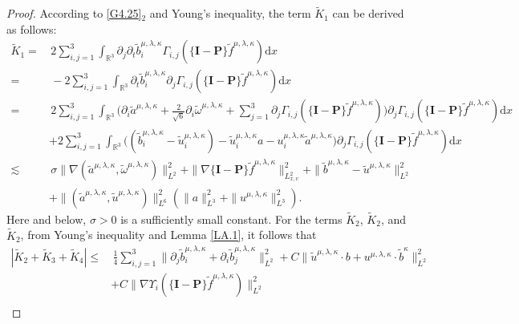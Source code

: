 \documentclass[reqno,11pt]{amsart}
\theoremstyle{plain}
\numberwithin{equation}{section}
\begin{document}
\begin{proof}
According to \eqref{G4.25}$_2$ and Young’s inequality, the term $\widetilde{K}_1$  can be derived as follows:  
\begin{align*}
\widetilde{K}_1=&\, 2\sum_{i, j=1}^3 \int_{\mathbb{R}^3}   \partial_j \partial_t \widetilde{b}^{\mu,\lambda,\kappa}_i   \Gamma_{i, j}(\{\mathbf{I}-\mathbf{P}\} \widetilde{f}^{\mu,\lambda,\kappa}) \mathrm{d} x\nonumber\\
=&\,  -2\sum_{i, j=1}^3 \int_{\mathbb{R}^3}    \partial_t \widetilde{b}^{\mu,\lambda,\kappa}_i   \partial_j\Gamma_{i, j}(\{\mathbf{I}-\mathbf{P}\} \widetilde{f}^{\mu,\lambda,\kappa}) \mathrm{d} x\nonumber\\
=&\,2\sum_{i, j=1}^3 \int_{\mathbb{R}^3} \Big(\partial_i \widetilde{a}^{\mu,\lambda,\kappa}+\frac{2}{\sqrt{6}} \partial_i \widetilde\omega^{\mu,\lambda,\kappa}+\sum_{j=1}^3 \partial_{j} \Gamma_{i, j}(\{\mathbf{I}-\mathbf{P}\} \widetilde{f}^{\mu,\lambda,\kappa})\Big)\partial_j\Gamma_{i, j}(\{\mathbf{I}-\mathbf{P}\} \widetilde{f}^{\mu,\lambda,\kappa}) \mathrm{d} x\nonumber\\
&+2\sum_{i, j=1}^3 \int_{\mathbb{R}^3} \big((\widetilde{b}^{\mu,\lambda,\kappa}_i-\widetilde{u}^{\mu,\lambda,\kappa}_i)-\widetilde{u}^{\mu,\lambda,\kappa}_i a-u_i^{\mu,\lambda,\kappa}\widetilde{a}^{\mu,\lambda,\kappa}\big)\partial_j\Gamma_{i, j}(\{\mathbf{I}-\mathbf{P}\} \widetilde{f}^{\mu,\lambda,\kappa}) \mathrm{d} x\nonumber\\
\lesssim&\,\sigma\|\nabla(\widetilde{a}^{\mu,\lambda,\kappa},\widetilde\omega^{\mu,\lambda,\kappa})\|_{L^2}^2+ \|\nabla \{\mathbf{I}-\mathbf{P}\} \widetilde{f}^{\mu,\lambda,\kappa}\|_{L_{x,v}^2}^2+ \|\widetilde{b}^{\mu,\lambda,\kappa}-\widetilde{u}^{\mu,\lambda,\kappa}\|_{L^2}^2\nonumber\\
&+\|(\widetilde{a}^{\mu,\lambda,\kappa},\widetilde{u}^{\mu,\lambda,\kappa})\|_{L^6}^2(\|a\|_{L^3}^2+\|u^{\mu,\lambda,\kappa}\|_{L^3}^2).
\end{align*}
Here and below, $\sigma>0$ is a sufficiently small constant.
For the terms $\widetilde{K}_2$, $\widetilde{K}_2$, and $\widetilde{K}_2$, from Young's inequality and Lemma \ref{LA.1}, it follows that  
\begin{align*}
|\widetilde{K}_2+\widetilde{K}_3+\widetilde{K}_4|\leq&\,  \frac{1}{4}\sum_{i, j=1}^3  \|  \partial_j \widetilde{b}^{\mu,\lambda,\kappa}_i+\partial_i \widetilde{b}^{\mu,\lambda,\kappa}_j  \|_{L^2}^2 +C \|\widetilde{u}^{\mu,\lambda,\kappa} \cdot b+u^{\mu,\lambda,\kappa}\cdot\widetilde{b}^\kappa\|_{L^2}^2\nonumber\\
&+C\|\nabla \Upsilon_i(\{\mathbf{I}-\mathbf{P}\} \widetilde{f}^{\mu,\lambda,\kappa})\|_{L^2}^2\nonumber\\

\end{align*}
\end{proof}
\end{document}

